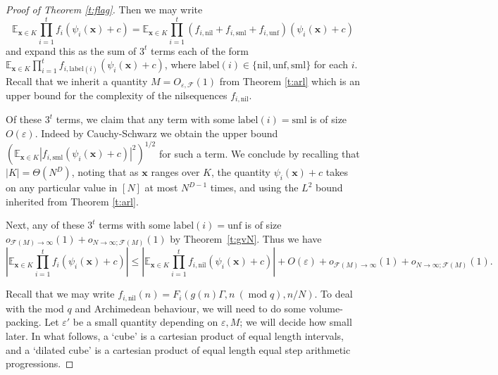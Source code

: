 \documentclass[10pt]{article}
\def\cF{\mathcal{F}}
\def\eps{\varepsilon}
\def\E{\mathbb{E}}
\def\nil{\mathrm{nil}}
\def\unf{\mathrm{unf}}
\def\sml{\mathrm{sml}}
\DeclareMathOperator\mo{mod}
\newcommand{\vect}[1]{\boldsymbol{#1}}
\begin{document}
\begin{proof}[Proof of Theorem \ref{t:flag}]
Then we may write \[ \E_{\vect x \in K}\prod_{i=1}^t  f_i(\psi_i(\vect x) + c) = \E_{\vect x \in K}\prod_{i=1}^t ( f_{i,\nil} +  f_{i,\sml} +  f_{i,\unf})(\psi_i(\vect x) + c)\] and expand this as the sum of $3^t$ terms each of the form $\E_{\vect x \in K}\prod_{i=1}^t  f_{i,\text{label}(i)}(\psi_i(\vect x) + c)$, where $\text{label}(i) \in \{\nil,\unf,\sml\}$ for each $i$. Recall that we inherit a quantity $M=O_{\eps,\cF}(1)$ from Theorem \ref{t:arl} which is an upper bound for the complexity of the nilsequences $f_{i,\nil}$. 

Of these $3^t$ terms, we claim that any term with some $\text{label}(i) = \sml$ is of size $O(\eps)$. Indeed by Cauchy-Schwarz we obtain the upper bound $(\E_{\vect x \in K} | f_{i,\sml}(\psi_i(\vect x) + c)|^2)^{1/2}$ for such a term. We conclude by recalling that $|K| = \Theta(N^D)$, noting that as $\vect x$ ranges over $K$, the quantity $\psi_i(\vect x) + c$ takes on any particular value in $[N]$ at most $N^{D-1}$ times, and using the $L^2$ bound inherited from Theorem \ref{t:arl}.

Next, any of these $3^t$ terms with some $\text{label}(i) = \unf$ is of size $o_{\cF(M) \to \infty}(1) + o_{N\to \infty; \cF(M)}(1)$ by Theorem~\ref{t:gvN}. Thus we have 
\begin{equation}\label{e:nilToMain}
\left|\E_{\vect x \in K}\prod_{i=1}^t  f_i(\psi_i(\vect x) + c)\right| \leq \left|\E_{\vect x \in K} \prod_{i=1}^t f_{i,\nil}( \psi_i(\vect x) + c)\right|+ O(\eps) + o_{\cF(M) \to \infty}(1) + o_{N\to \infty; \cF(M)}(1).
\end{equation}


Recall that we may write $ f_{i,\nil}(n) = F_i(g(n)\Gamma, n \ (\mo q), n/N)$. To deal with the mod $q$ and Archimedean behaviour, we will need to do some volume-packing. Let $\eps'$ be a small quantity depending on $\eps, M$; we will decide how small later. In what follows, a `cube' is a cartesian product of equal length intervals, and a `dilated cube' is a cartesian product of equal length equal step arithmetic progressions.


\end{proof}
\end{document}
